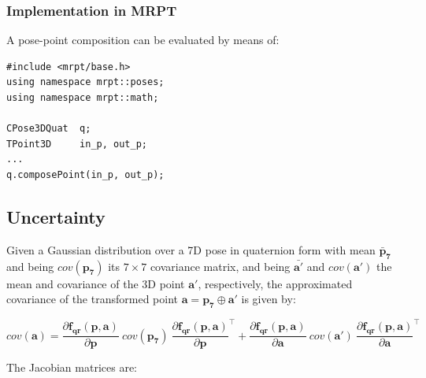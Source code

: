\documentclass[a4paper,10pt]{report}
\begin{document}
\subsubsection{Implementation in MRPT}

A pose-point composition can be evaluated by means of:

\begin{lstlisting}
#include <mrpt/base.h> 
using namespace mrpt::poses; 
using namespace mrpt::math; 

CPose3DQuat  q;
TPoint3D     in_p, out_p;
...
q.composePoint(in_p, out_p);
\end{lstlisting}


\subsection{Uncertainty}

Given a Gaussian distribution over a 7D pose in quaternion form with 
mean ${\mathbf{\bar{p}_7}}$ and being $cov(\mathbf{p_7})$ its $7 \times 7$ covariance matrix, 
and being ${\mathbf{\bar{a'}}}$ and $cov(\mathbf{a'})$ the mean and covariance of the 3D point 
$\mathbf{a'}$, respectively, the approximated covariance of the transformed point 
$\mathbf{a} = \mathbf{p_7} \oplus \mathbf{a'}$ is given by:

\begin{equation}
cov(\mathbf{a}) =
\frac{\partial \mathbf{f_{qr}} (\mathbf{p},\mathbf{a})}{\partial \mathbf{p}} ~
cov(\mathbf{p_7})  ~
\frac{\partial \mathbf{f_{qr}} (\mathbf{p},\mathbf{a})}{\partial \mathbf{p}}^\top 
+
\frac{\partial \mathbf{f_{qr}} (\mathbf{p},\mathbf{a})}{\partial \mathbf{a}} ~ 
cov(\mathbf{a'})  ~
\frac{\partial \mathbf{f_{qr}} (\mathbf{p},\mathbf{a})}{\partial \mathbf{a}}^\top
\end{equation}


The Jacobian matrices are:
\end{document}
